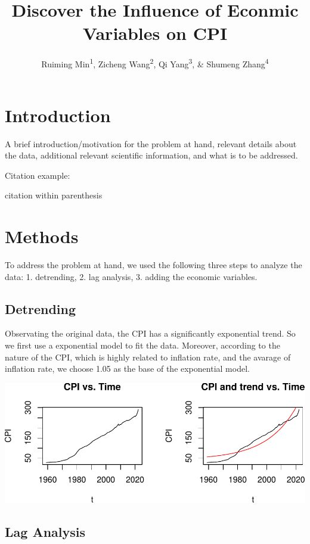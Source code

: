 \documentclass[
  man,floatsintext,
  man]{apa6}
\title{Discover the Influence of Econmic Variables on CPI}
\author{Ruiming Min\textsuperscript{1}, Zicheng Wang\textsuperscript{2}, Qi Yang\textsuperscript{3}, \& Shumeng Zhang\textsuperscript{4}}
\date{}
\affiliation{\vspace{0.5cm}\textsuperscript{2} UIUC}
\begin{document}
\maketitle

\section{Introduction}\label{introduction}

A brief introduction/motivation for the problem at hand, relevant details about the data, additional relevant scientific information, and what is to be addressed.

Citation example:

citation within parenthesis \autocite{tsa4}

\section{Methods}\label{methods}

To address the problem at hand, we used the following three steps to analyze the data: 1. detrending, 2. lag analysis, 3. adding the economic variables.

\subsection{Detrending}\label{detrending}

Observating the original data, the CPI has a significantly exponential trend. So we first use a exponential model to fit the data.
Moreover, according to the nature of the CPI, which is highly related to inflation rate, and the avarage of inflation rate, we choose 1.05 as the base of the exponential model.

\includegraphics{stat429_group2_final_proj_files/figure-latex/unnamed-chunk-1-1.pdf}

\subsection{Lag Analysis}\label{lag-analysis}
\end{document}
